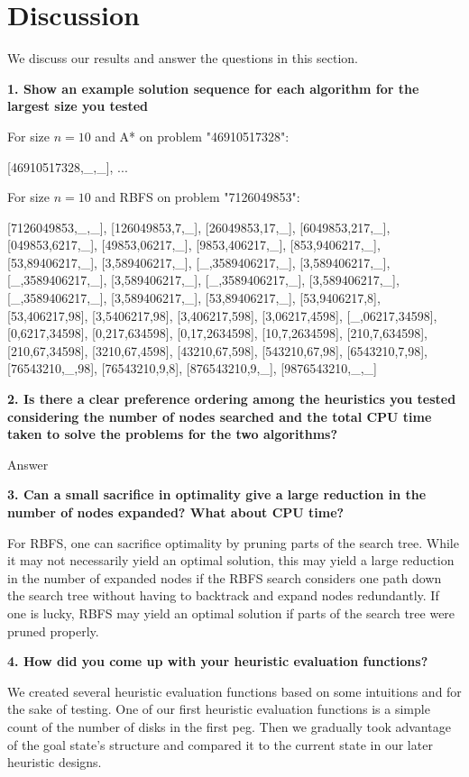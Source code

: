 \section{Discussion}

We discuss our results and answer the questions in this section.

\textbf{1. Show an example solution sequence for each algorithm for the largest size you tested}

For size $n = 10$ and A* on problem "46910517328":

[46910517328,\_,\_], ...

For size $n = 10$ and RBFS on problem "7126049853":

[7126049853,\_,\_], [126049853,7,\_], [26049853,17,\_], [6049853,217,\_], [049853,6217,\_], [49853,06217,\_], [9853,406217,\_], [853,9406217,\_], [53,89406217,\_], [3,589406217,\_], [\_,3589406217,\_], [3,589406217,\_], [\_,3589406217,\_], [3,589406217,\_], [\_,3589406217,\_], [3,589406217,\_], [\_,3589406217,\_], [3,589406217,\_], [53,89406217,\_], [53,9406217,8], [53,406217,98], [3,5406217,98], [3,406217,598], [3,06217,4598], [\_,06217,34598], [0,6217,34598], [0,217,634598], [0,17,2634598], [10,7,2634598], [210,7,634598], [210,67,34598], [3210,67,4598], [43210,67,598], [543210,67,98], [6543210,7,98], [76543210,\_,98], [76543210,9,8], [876543210,9,\_], [9876543210,\_,\_]

\textbf{2. Is there a clear preference ordering among the heuristics you tested considering the number of nodes searched and the total CPU time taken to solve the problems for the two algorithms?}

Answer

\textbf{3. Can a small sacrifice in optimality give a large reduction in the number of nodes expanded? What about CPU time?}

For RBFS, one can sacrifice optimality by pruning parts of the search tree. While it may not necessarily yield an optimal solution, this may yield a large reduction in the number of expanded nodes if the RBFS search considers one path down the search tree without having to backtrack and expand nodes redundantly. If one is lucky, RBFS may yield an optimal solution if parts of the search tree were pruned properly.

\textbf{4. How did you come up with your heuristic evaluation functions?}

We created several heuristic evaluation functions based on some intuitions and for the sake of testing. One of our first heuristic evaluation functions is a simple count of the number of disks in the first peg. Then we gradually took advantage of the goal state's structure and compared it to the current state in our later heuristic designs.

